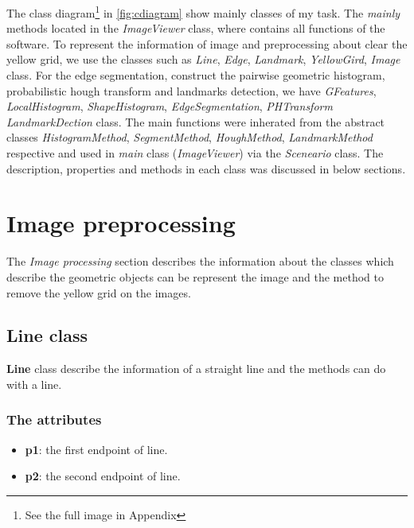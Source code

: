 The class diagram\footnote{See the full image in Appendix} in \ref{fig:cdiagram} show mainly classes of my task. The \textit{mainly} methods located in the \textit{ImageViewer} class, where contains all functions of the software. To represent the information of image and preprocessing about clear the yellow grid, we use the classes such as \textit{Line}, \textit{Edge}, \textit{Landmark}, \textit{YellowGird}, \textit{Image} class. For the edge segmentation, construct the pairwise geometric histogram, probabilistic hough transform and landmarks detection, we have \textit{GFeatures}, \textit{LocalHistogram}, \textit{ShapeHistogram}, \textit{EdgeSegmentation}, \textit{PHTransform} \textit{LandmarkDection} class. The main functions were inherated from the abstract classes \textit{HistogramMethod}, \textit{SegmentMethod}, \textit{HoughMethod}, \textit{LandmarkMethod} respective and used in \textit{main} class (\textit{ImageViewer}) via the \textit{Sceneario} class. The description, properties and methods in each class was discussed in below sections.
\section{Image preprocessing}
The \textit{Image processing} section describes the information about the classes which describe the geometric objects can be represent the image and the method to remove the yellow grid on the images.
\subsection{Line class}
\textbf{Line} class describe the information of a straight line and the methods can do with a line.
\subsubsection{The attributes}
\begin{itemize}
\item\textbf{p1}: the first endpoint of line.
\item\textbf{p2}: the second endpoint of line.
\end{itemize}
